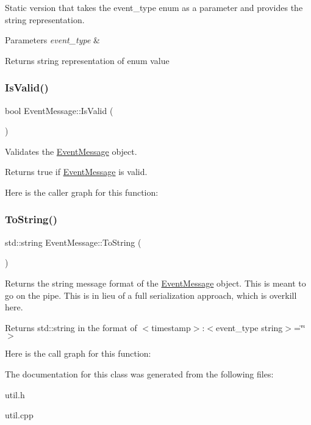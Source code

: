 Static version that takes the event\+\_\+type enum as a parameter and provides the string representation. 


\begin{DoxyParams}{Parameters}
{\em event\+\_\+type} & \\
\hline
\end{DoxyParams}
\begin{DoxyReturn}{Returns}
string representation of enum value 
\end{DoxyReturn}
\mbox{\label{classEventMessage_aa5356a869ca843577b6af64f5c1c9297}} 
\subsubsection{\texorpdfstring{Is\+Valid()}{IsValid()}}
{\footnotesize\ttfamily bool Event\+Message\+::\+Is\+Valid (\begin{DoxyParamCaption}{ }\end{DoxyParamCaption})}



Validates the \mbox{\hyperlink{classEventMessage}{Event\+Message}} object. 

\begin{DoxyReturn}{Returns}
true if \mbox{\hyperlink{classEventMessage}{Event\+Message}} is valid. 
\end{DoxyReturn}
Here is the caller graph for this function\+:
\mbox{\label{classEventMessage_ae13342857432d5274f4d86ecc87cb613}} 
\subsubsection{\texorpdfstring{To\+String()}{ToString()}}
{\footnotesize\ttfamily std\+::string Event\+Message\+::\+To\+String (\begin{DoxyParamCaption}{ }\end{DoxyParamCaption})}



Returns the string message format of the \mbox{\hyperlink{classEventMessage}{Event\+Message}} object. This is meant to go on the pipe. This is in lieu of a full serialization approach, which is overkill here. 

\begin{DoxyReturn}{Returns}
std\+::string in the format of $<$timestamp$>$\+:$<$event\+\_\+type string$>$=\char`\"{}\char`\"{}$>$ 
\end{DoxyReturn}
Here is the call graph for this function\+:


The documentation for this class was generated from the following files\+:\begin{DoxyCompactItemize}
\item 
util.\+h\item 
util.\+cpp\end{DoxyCompactItemize}
